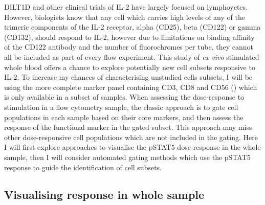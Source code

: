 DILT1D and other clinical trials of IL-2 have largely focused on lymphoyctes. %
However, biologists know that any cell which carries high levels of any of the trimeric components of the IL-2 receptor,
alpha (CD25), beta (CD122) or gamma (CD132), should respond to IL-2, however
due to limitations on binding affinity of the CD122 antibody and the number of fluorochromes per tube,
they cannot all be included as part of every flow experiment.  
This study of \emph{ex vivo} stimulated whole blood offers a chance to explore potentially new cell subsets responsive to IL-2.
To increase my chances of characterising unstudied cells subsets, I will be using the more complete marker panel containing CD3, CD8
and CD56 () which is only available in a subset of samples.
When assessing the dose-response to stimulation in a flow cytometry sample,
the classic approach is to gate cell populations in each sample based on their core markers,
and then assess the response of the functional marker in the gated subset.
This approach may miss other dose-responsive cell populations which are not included in the gating.
Here I will first explore approaches to visualise the pSTAT5 dose-response in the whole sample,
then I will consider automated gating methods which use the pSTAT5 response to guide the identification of cell subsets.




\subsection{Visualising response in whole sample}

